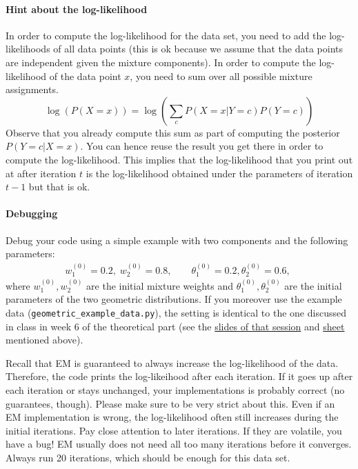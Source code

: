 \documentclass[11pt, a4paper]{article}
\begin{document}
\paragraph{Hint about the log-likelihood} 
In order to compute the log-likelihood for the data set, you need to add the log-likelihoods of all data points (this is
ok because we assume that the data points are independent given the mixture components). In order to compute the log-likelihood of the data point $ x $, you need
to sum over all possible mixture assignments.
\begin{equation}
\log(P(X=x)) = \log\left(\sum_{c} P(X=x|Y=c) P(Y=c)\right)
\end{equation}
Observe that you already compute this sum as part of computing the posterior $ P(Y=c|X=x) $. You can hence reuse the result you get there in order to compute the 
log-likelihood. This implies that the log-likelihood that you print out at after iteration $ t $ is the log-likelihood obtained under the parameters of iteration
$ t-1 $ but that is ok.


\paragraph{Debugging}

Debug your code using a simple example with two components and the following parameters:
\begin{align}
  w_1^{(0)} = 0.2, \; w_2^{(0)} = 0.8, \qquad \theta_1^{(0)} = 0.2, \theta_2^{(0)} = 0.6,\;
\end{align}
where $w_1^{(0)}, w_2^{(0)}$ are the initial mixture weights and $\theta_1^{(0)}, \theta_2^{(0)}$ are the initial parameters of the two geometric distributions.
If you moreover use the example data (\texttt{geometric\_example\_data.py}), the setting is identical to the one discussed in class in week 6 of the theoretical part (see the \href{https://canvas.uva.nl/courses/536/files/10975?module_item_id=8863}{slides of that session} and  \href{https://docs.google.com/spreadsheets/d/1jlfex_GhObM_00iOnop4AEOW07pxVn1AGavOTcrAmBg}{sheet} mentioned above).


Recall that EM is guaranteed to always increase the log-likelihood of the data. Therefore, the code prints the log-likeihood after each iteration.
If it goes up after each iteration or stays unchanged, your implementations is probably correct (no guarantees, though). Please make sure to be very strict about
this. Even if an EM implementation is wrong, the log-likelihood often still increases during the initial iterations. Pay close attention to later iterations. If they
are volatile, you have a bug! EM usually does not need all too many iterations before it converges. Always run 20 iterations, which should be enough for 
this data set.
\end{document}
